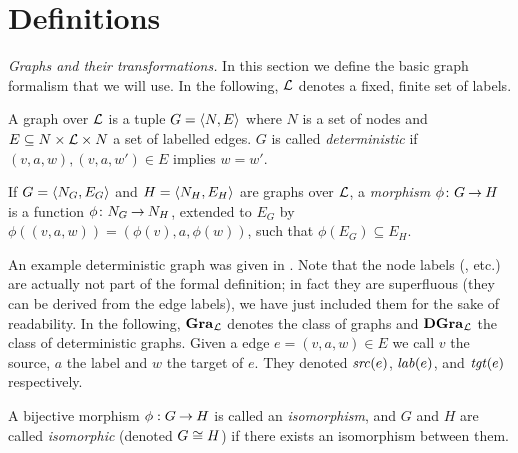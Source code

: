 \section{Definitions}

\textit{Graphs and their transformations.}
%
In this section we define the basic graph formalism that we will use. In the
following, ${\cal L}$ denotes a fixed, finite set of labels.

\begin{definition} 
  A graph over ${\cal L}$ is a tuple $G={\langle N,E \rangle}$ where $N$ is a set of nodes
  and $E \subseteq N \times {\cal L} \times N$ a set of labelled edges. $G$ is
  called \emph{deterministic} if $(v,a,w),(v,a,w')\in E$ implies $w=w'$.
  
  If $G={\langle N_G,E_G \rangle}$ and $H={\langle N_H,E_H \rangle}$ are graphs over ${\cal L}$, a {\em
  morphism} $\phi\colon {G} \mathbin{\rightarrow} {H}$ is a function $\phi\colon {N_G} \mathbin{\rightarrow} {N_H}$, extended to
  $E_G$ by $\phi((v,a,w))=(\phi(v),a,\phi(w))$, such that $\phi(E_G)\subseteq
  E_H$.
\end{definition}
%
An example deterministic graph was given in . Note that the
node labels (\LB, \LC{} etc.) are actually not part of the formal
definition; in fact they are superfluous (they can be derived from the edge
labels), we have just included them for the sake of readability.  In the
following, $\mathbf{Gra}_{\cal L}$ denotes the class of graphs and $\mathbf{DGra}_{\cal L}$ the class
of deterministic graphs.  Given a edge $e=(v,a,w) \in E$ we call $v$ the
source, $a$ the label and $w$ the target of $e$. They denoted
$\mathit{src}(e)$, $\mathit{lab}(e)$, and $\mathit{tgt}(e)$ respectively.

A bijective morphism $\phi:G \mathbin{\rightarrow} H$ is called an {\em isomorphism}, and 
$G$ and $H$ are called {\em isomorphic} (denoted $G \cong H$) if
there exists an isomorphism between them.

